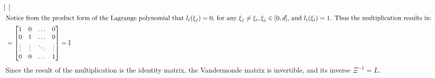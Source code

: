 \documentclass[11pt,a4paper]{article}
\begin{document}
\begin{enumerate}
\begin{align*}
\begin{bmatrix}
		                      \end{bmatrix}                                                                         \\
		      \intertext{Notice from the product form of the Lagrange polynomial that $l_i(\xi_j) = 0$, for any $\xi_j \neq \xi_i, \xi_j \in [0, d]$,
			      and $l_i(\xi_i) = 1$. Thus the multiplication results in:}
		                  & = \begin{bmatrix}
			                      1      & 0      & \ldots & 0      \\
			                      0      & 1      & \ldots & 0      \\
			                      \vdots & \vdots & \ddots & \vdots \\
			                      0      & 0      & \ldots & 1
		                      \end{bmatrix} = \mathbb{I}
	      \end{align*}
	      Since the result of the multiplication is the identity matrix, the Vandermonde matrix is invertible, and its inverse $\Xi^{-1} =
		      L$.
	      \newpage


\end{enumerate}
\end{document}

